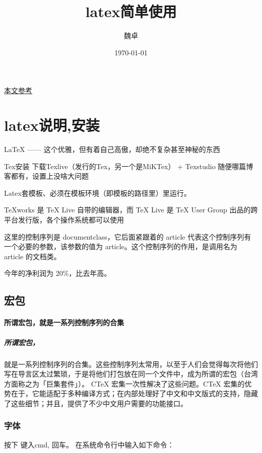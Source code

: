 \documentclass[UTF8]{ctexart}
\title{latex简单使用}
\author{魏卓}
\date{\today}
\begin{document}
	\maketitle
	\tableofcontents  %
	
	\href{https://liam.page/2014/09/08/latex-introduction/}{本文参考}
	\section{latex说明,安装}
	LaTeX —— 这个优雅，但有着自己高傲，却绝不复杂甚至神秘的东西
	
	Tex安装 下载Texlive（发行的Tex，另一个是MiKTex） + Texstudio 随便哪篇博客都有，设置上没啥大问题 
	
	Latex套模板、必须在模板环境（即模板的路径里）里运行。
	
	TeXworks 是 TeX Live 自带的编辑器，而 TeX Live 是 TeX User Group 出品的跨平台发行版，各个操作系统都可以使用
	
	
	这里的控制序列是 documentclass，它后面紧跟着的 {article} 代表这个控制序列有一个必要的参数，该参数的值为 article。这个控制序列的作用，是调用名为 article 的文档类。
	
	
	今年的净利润为 20\%，比去年高。 %
	
	\subsection{宏包}
	\paragraph{所谓宏包，就是一系列控制序列的合集}
	\subparagraph{所谓宏包，}就是一系列控制序列的合集。这些控制序列太常用，以至于人们会觉得每次将他们写在导言区太过繁琐，于是将他们打包放在同一个文件中，成为所谓的宏包（台湾方面称之为「巨集套件」）。
	CTeX 宏集一次性解决了这些问题。CTeX 宏集的优势在于，它能适配于多种编译方式；在内部处理好了中文和中文版式的支持，隐藏了这些细节；并且，提供了不少中文用户需要的功能接口。
	
	
	\subsubsection{字体}
	按下%
	键入cmd, 回车。
	在系统命令行中输入如下命令：
	
\end{document}
